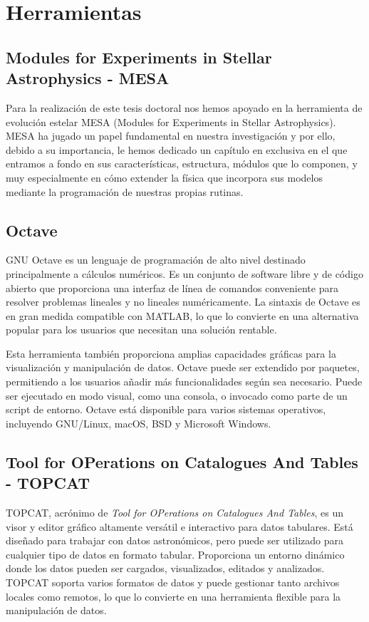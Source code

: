 \section{Herramientas}
\subsection{Modules for Experiments in Stellar Astrophysics - MESA}
Para la realización de este tesis doctoral nos hemos apoyado en la herramienta de evolución estelar MESA (Modules for Experiments in Stellar Astrophysics). MESA ha jugado un papel fundamental en nuestra investigación y por ello, debido a su importancia, le hemos dedicado un capítulo en exclusiva en el que entramos a fondo en sus características, estructura, módulos que lo componen, y muy especialmente en cómo extender la física que incorpora sus modelos mediante la programación de nuestras propias rutinas.\par


\subsection{Octave} \label{sec:tool_octave}
GNU Octave es un lenguaje de programación de alto nivel destinado principalmente a cálculos numéricos. Es un conjunto de software libre y de código abierto que proporciona una interfaz de línea de comandos conveniente para resolver problemas lineales y no lineales numéricamente. La sintaxis de Octave es en gran medida compatible con MATLAB, lo que lo convierte en una alternativa popular para los usuarios que necesitan una solución rentable.\par 

Esta herramienta también proporciona amplias capacidades gráficas para la visualización y manipulación de datos. Octave puede ser extendido por paquetes, permitiendo a los usuarios añadir más funcionalidades según sea necesario. Puede ser ejecutado en modo visual, como una consola, o invocado como parte de un script de entorno. Octave está disponible para varios sistemas operativos, incluyendo GNU/Linux, macOS, BSD y Microsoft Windows.

\subsection{Tool for OPerations on Catalogues And Tables - TOPCAT} \label{sec:tool_topcat}
TOPCAT, acrónimo de \textit{Tool for OPerations on Catalogues And Tables}, es un visor y editor gráfico altamente versátil e interactivo para datos tabulares. Está diseñado para trabajar con datos astronómicos, pero puede ser utilizado para cualquier tipo de datos en formato tabular. Proporciona un entorno dinámico donde los datos pueden ser cargados, visualizados, editados y analizados. TOPCAT soporta varios formatos de datos y puede gestionar tanto archivos locales como remotos, lo que lo convierte en una herramienta flexible para la manipulación de datos.\par

